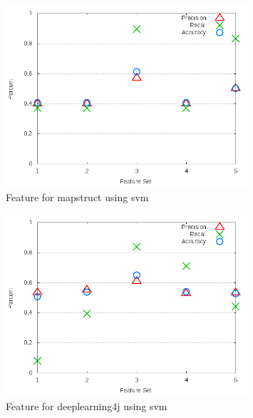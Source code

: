 \begin{figure}[!t]
\centering
\includegraphics[width=0.8\textwidth]{images/svm/test_3/mapstruct_sample_range.png}
\caption{Feature for mapstruct using \gls{svm}}
\label{fig:test_3_mapstruct_svm}
\end{figure}

\begin{figure}[!t]
\centering
\includegraphics[width=0.8\textwidth]{images/svm/test_3/deeplearning4j_sample_range.png}
\caption{Feature for deeplearning4j using \gls{svm}}
\label{fig:test_3_deeplearning4j_svm}
\end{figure}

